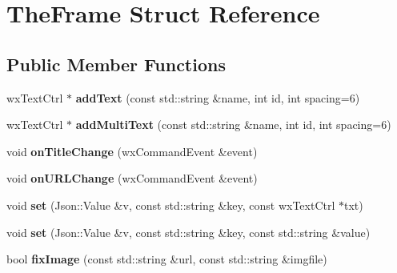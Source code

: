 \hypertarget{struct_the_frame}{\section{The\-Frame Struct Reference}
\label{struct_the_frame}
}
\subsection*{Public Member Functions}
\begin{DoxyCompactItemize}
\item 
\hypertarget{struct_the_frame_a8e85fd4a635ab80ef171d22208c846e8}{wx\-Text\-Ctrl $\ast$ {\bfseries add\-Text} (const std\-::string \&name, int id, int spacing=6)}\label{struct_the_frame_a8e85fd4a635ab80ef171d22208c846e8}

\item 
\hypertarget{struct_the_frame_ac97010df2b6347ede1ab359dc6b996ba}{wx\-Text\-Ctrl $\ast$ {\bfseries add\-Multi\-Text} (const std\-::string \&name, int id, int spacing=6)}\label{struct_the_frame_ac97010df2b6347ede1ab359dc6b996ba}

\item 
\hypertarget{struct_the_frame_a299f106f69543e75c8f4c2b26246516e}{void {\bfseries on\-Title\-Change} (wx\-Command\-Event \&event)}\label{struct_the_frame_a299f106f69543e75c8f4c2b26246516e}

\item 
\hypertarget{struct_the_frame_aa3f4279cc4ced529fe31d44a24c23f23}{void {\bfseries on\-U\-R\-L\-Change} (wx\-Command\-Event \&event)}\label{struct_the_frame_aa3f4279cc4ced529fe31d44a24c23f23}

\item 
\hypertarget{struct_the_frame_a9042a0a3277c7ac1e9e628ea7327ea0a}{void {\bfseries set} (Json\-::\-Value \&v, const std\-::string \&key, const wx\-Text\-Ctrl $\ast$txt)}\label{struct_the_frame_a9042a0a3277c7ac1e9e628ea7327ea0a}

\item 
\hypertarget{struct_the_frame_ae8a29d6e5f0df491dfde4d41182b6cfa}{void {\bfseries set} (Json\-::\-Value \&v, const std\-::string \&key, const std\-::string \&value)}\label{struct_the_frame_ae8a29d6e5f0df491dfde4d41182b6cfa}

\item 
\hypertarget{struct_the_frame_ac06553e384df8d78b6e43f6ec2e07569}{bool {\bfseries fix\-Image} (const std\-::string \&url, const std\-::string \&imgfile)}\label{struct_the_frame_ac06553e384df8d78b6e43f6ec2e07569}


\end{DoxyCompactItemize}
